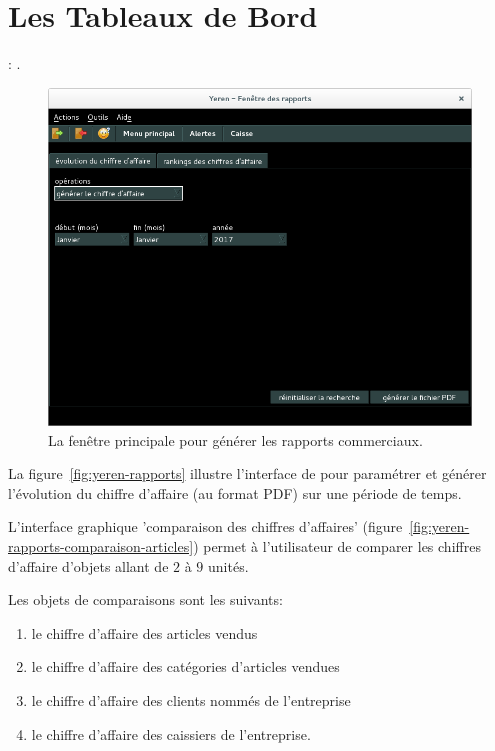 \chapter{Les Tableaux de Bord}\label{chap:tableaux-de-bord}

\utilisateurs: \lienpatron.\\


\label{sec:tableaux-introduction}

\begin{figure}[!htbp]
	\centering
	\includegraphics[scale=0.45]{images/yeren-rapports.png}
	\caption{La fen\^etre principale pour g\'en\'erer les rapports commerciaux.}
	\label{fig:yeroth-tableaux}
\end{figure}

La figure~\ref{fig:yeren-rapports} illustre l'interface
de \yeren pour param\'etrer et g\'en\'erer l'\'evolution
du chiffre d'affaire (au format PDF) sur une p\'eriode de temps.

L'interface graphique 'comparaison des chiffres d'affaires'
(figure~\ref{fig:yeren-rapports-comparaison-articles})
permet \`a l'utilisateur de comparer les chiffres
d'affaire d'objets allant de $2$ \`a $9$ unit\'es.

Les objets de comparaisons sont les suivants:
\begin{enumerate}[1)]
	\item le chiffre d'affaire des articles vendus
	\item le chiffre d'affaire des cat\'egories d'articles vendues
	\item le chiffre d'affaire des clients nomm\'es de l'entreprise
	\item le chiffre d'affaire des caissiers de l'entreprise.\\
\end{enumerate}

